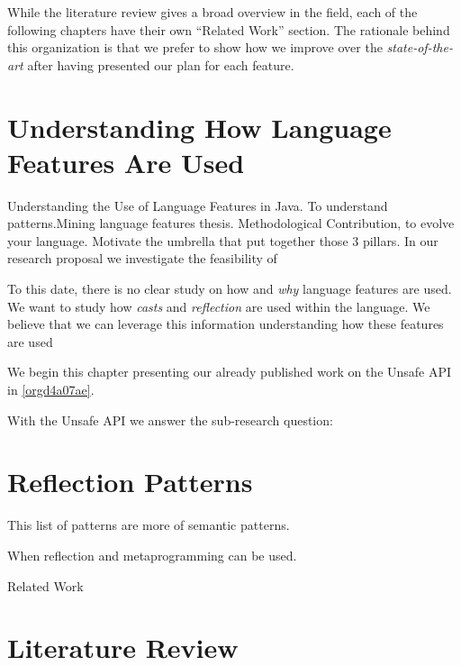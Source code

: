 While the literature review gives a broad overview in the field, each of the following chapters have their own ``Related Work'' section. 
The rationale behind this organization is that we prefer to show how we improve over the \emph{state-of-the-art} after having presented our plan for each feature.

\chapter{Understanding How \java{} Language Features Are Used}
\label{sec:org6351c27}
Understanding the Use of Language Features in Java.
To understand patterns.Mining language features thesis.
Methodological Contribution, to evolve your language.
Motivate the umbrella that put together those 3 pillars.
In our research proposal we investigate the feasibility of

To this date, there is no clear study on how and \emph{why} language features are used.
We want to study how \emph{casts} and \emph{reflection} are used within the \java{} language.
We believe that we can leverage this information
understanding how these features are used

We begin this chapter presenting our already published work on the Unsafe API in \ref{orgd4a07ae}.

With the Unsafe API we answer the sub-research question:

\chapter{Reflection Patterns \label{org7b69368}}
\label{sec:org2457f5d}

This list of patterns are more of semantic patterns.

When reflection and metaprogramming can be used.

Related Work

\chapter{Literature Review}


